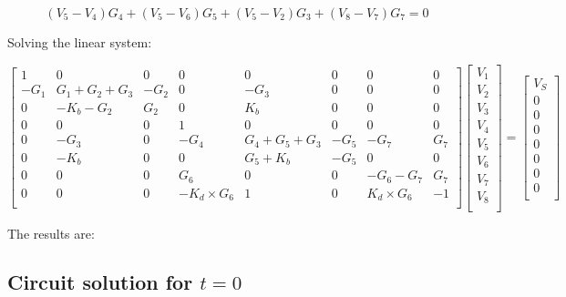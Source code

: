 \begin{equation}
  (V_5-V_4)G_4 + (V_5-V_6)G_5 + (V_5-V_2)G_3 + (V_8-V_7)G_7 = 0
  \label{eq:Node5}
\end{equation}

Solving the linear system:

$$
\begin{bmatrix}
1  &  0 & 0 & 0 & 0 & 0 & 0 & 0       \\
-G_1 & G_1+G_2+G_3 & -G_2 & 0 & -G_3 & 0 & 0 & 0      \\
0 & -K_b-G_2 & G_2 & 0 & K_b & 0 & 0 & 0\\
0 & 0 & 0  & 1 & 0 & 0 & 0 & 0      \\
0 & -G_3 & 0 & -G_4 & G_4+G_5+G_3 & -G_5 & -G_7 & G_7\\
0 & -K_b & 0 & 0 & G_5+K_b & -G_5 & 0 & 0 \\
0 & 0& 0 & G_6 & 0 & 0 & -G_6-G_7 & G_7\\
0 & 0 & 0 & -K_d\times G_6 & 1 & 0 & K_d\times G_6 & -1\\
\end{bmatrix}
\begin{bmatrix}
V_1     \\
V_2    \\
V_3   \\
V_4     \\
V_5     \\
V_6     \\
V_7     \\
V_8     \\
\end{bmatrix}
=
\begin{bmatrix}
V_S   \\
0    \\
0  \\
0  \\
0  \\
0  \\
0  \\
0  \\
\end{bmatrix}
\quad
$$

The results are:






\subsection{Circuit solution for $t=0$}

